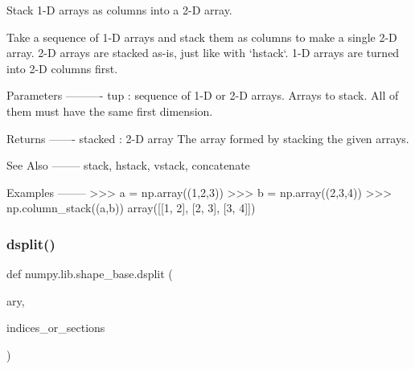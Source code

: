\begin{DoxyVerb}Stack 1-D arrays as columns into a 2-D array.

Take a sequence of 1-D arrays and stack them as columns
to make a single 2-D array. 2-D arrays are stacked as-is,
just like with `hstack`.  1-D arrays are turned into 2-D columns
first.

Parameters
----------
tup : sequence of 1-D or 2-D arrays.
    Arrays to stack. All of them must have the same first dimension.

Returns
-------
stacked : 2-D array
    The array formed by stacking the given arrays.

See Also
--------
stack, hstack, vstack, concatenate

Examples
--------
>>> a = np.array((1,2,3))
>>> b = np.array((2,3,4))
>>> np.column_stack((a,b))
array([[1, 2],
       [2, 3],
       [3, 4]])\end{DoxyVerb}
 \mbox{\label{namespacenumpy_1_1lib_1_1shape__base_a3e9f077fad5afa6186a0e5bb79eae429}} 
\subsubsection{\texorpdfstring{dsplit()}{dsplit()}}
{\footnotesize\ttfamily def numpy.\+lib.\+shape\+\_\+base.\+dsplit (\begin{DoxyParamCaption}\item[{}]{ary,  }\item[{}]{indices\+\_\+or\+\_\+sections }\end{DoxyParamCaption})}

